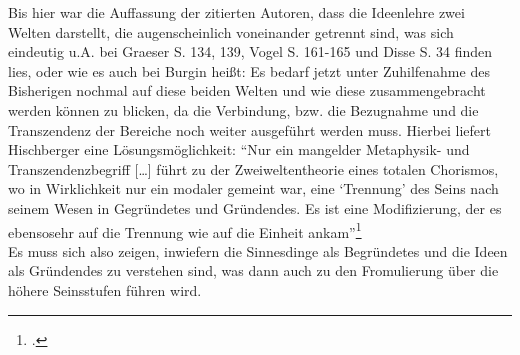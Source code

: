 Bis hier war die Auffassung der zitierten Autoren, dass die Ideenlehre zwei Welten darstellt, die augenscheinlich voneinander getrennt sind, was sich eindeutig u.A. bei Graeser S. 134, 139, Vogel S. 161-165 und Disse S. 34 finden lies, oder wie es auch bei Burgin heißt: 
Es bedarf jetzt unter Zuhilfenahme des Bisherigen nochmal auf diese beiden Welten und wie diese zusammengebracht werden können zu blicken, da die Verbindung, bzw. die Bezugnahme und die Transzendenz der Bereiche noch weiter ausgeführt werden muss.
Hierbei liefert Hischberger eine Lösungsmöglichkeit:
\enquote{Nur ein mangelder Metaphysik- und Transzendenzbegriff [\dots] führt zu der Zweiweltentheorie eines totalen Chorismos, wo in Wirklichkeit nur ein modaler gemeint war, eine \enquote{Trennung} des Seins nach seinem Wesen in Gegründetes und Gründendes. Es ist eine Modifizierung, der es ebensosehr auf die Trennung wie auf die Einheit ankam}\footcite[][S. 96]{Hirschberger}\\
Es muss sich also zeigen, inwiefern die Sinnesdinge als Begründetes und die Ideen als Gründendes zu verstehen sind, was dann auch zu den Fromulierung über die höhere Seinsstufen führen wird.
